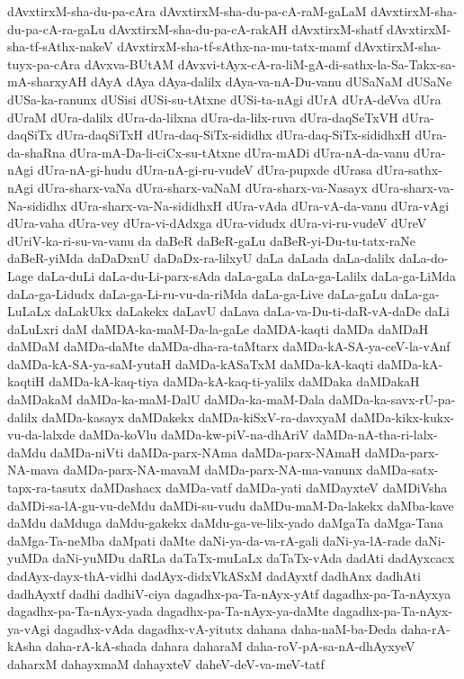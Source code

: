 {dAvxtirxM-sha-du-pa-cAra
dAvxtirxM-sha-du-pa-cA-raM-gaLaM
dAvxtirxM-sha-du-pa-cA-ra-gaLu
dAvxtirxM-sha-du-pa-cA-rakAH
dAvxtirxM-shatf
dAvxtirxM-sha-tf-sAthx-nakeV
dAvxtirxM-sha-tf-sAthx-na-mu-tatx-mamf
dAvxtirxM-sha-tuyx-pa-cAra
dAvxva-BUtAM
dAvxvi-tAyx-cA-ra-liM-gA-di-sathx-la-Sa-Takx-sa-mA-sharxyAH
dAyA
dAya
dAya-dalilx
dAya-va-nA-Du-vanu
dUSaNaM
dUSaNe
dUSa-ka-ranunx
dUSisi
dUSi-su-tAtxne
dUSi-ta-nAgi
dUrA
dUrA-deVva
dUra
dUraM
dUra-dalilx
dUra-da-lilxna
dUra-da-lilx-ruva
dUra-daqSeTxVH
dUra-daqSiTx
dUra-daqSiTxH
dUra-daq-SiTx-sididhx
dUra-daq-SiTx-sididhxH
dUra-da-shaRna
dUra-mA-Da-li-ciCx-su-tAtxne
dUra-mADi
dUra-nA-da-vanu
dUra-nAgi
dUra-nA-gi-hudu
dUra-nA-gi-ru-vudeV
dUra-pupxde
dUrasa
dUra-sathx-nAgi
dUra-sharx-vaNa
dUra-sharx-vaNaM
dUra-sharx-va-Nasayx
dUra-sharx-va-Na-sididhx
dUra-sharx-va-Na-sididhxH
dUra-vAda
dUra-vA-da-vanu
dUra-vAgi
dUra-vaha
dUra-vey
dUra-vi-dAdxga
dUra-vidudx
dUra-vi-ru-vudeV
dUreV
dUriV-ka-ri-su-va-vanu
da
daBeR
daBeR-gaLu
daBeR-yi-Du-tu-tatx-raNe
daBeR-yiMda
daDaDxnU
daDaDx-ra-lilxyU
daLa
daLada
daLa-dalilx
daLa-do-Lage
daLa-duLi
daLa-du-Li-parx-sAda
daLa-gaLa
daLa-ga-Lalilx
daLa-ga-LiMda
daLa-ga-Lidudx
daLa-ga-Li-ru-vu-da-riMda
daLa-ga-Live
daLa-gaLu
daLa-ga-LuLaLx
daLakUkx
daLakekx
daLavU
daLava
daLa-va-Du-ti-daR-vA-daDe
daLi
daLuLxri
daM
daMDA-ka-maM-Da-la-gaLe
daMDA-kaqti
daMDa
daMDaH
daMDaM
daMDa-daMte
daMDa-dha-ra-taMtarx
daMDa-kA-SA-ya-ceV-la-vAnf
daMDa-kA-SA-ya-saM-yutaH
daMDa-kASaTxM
daMDa-kA-kaqti
daMDa-kA-kaqtiH
daMDa-kA-kaq-tiya
daMDa-kA-kaq-ti-yalilx
daMDaka
daMDakaH
daMDakaM
daMDa-ka-maM-DalU
daMDa-ka-maM-Dala
daMDa-ka-savx-rU-pa-dalilx
daMDa-kasayx
daMDakekx
daMDa-kiSxV-ra-davxyaM
daMDa-kikx-kukx-vu-da-lalxde
daMDa-koVlu
daMDa-kw-piV-na-dhAriV
daMDa-nA-tha-ri-lalx-daMdu
daMDa-niVti
daMDa-parx-NAma
daMDa-parx-NAmaH
daMDa-parx-NA-mava
daMDa-parx-NA-mavaM
daMDa-parx-NA-ma-vanunx
daMDa-satx-tapx-ra-tasutx
daMDashacx
daMDa-vatf
daMDa-yati
daMDayxteV
daMDiVsha
daMDi-sa-lA-gu-vu-deMdu
daMDi-su-vudu
daMDu-maM-Da-lakekx
daMba-kave
daMdu
daMduga
daMdu-gakekx
daMdu-ga-ve-lilx-yado
daMgaTa
daMga-Tana
daMga-Ta-neMba
daMpati
daMte
daNi-ya-da-va-rA-gali
daNi-ya-lA-rade
daNi-yuMDa
daNi-yuMDu
daRLa
daTaTx-muLaLx
daTaTx-vAda
dadAti
dadAyxcacx
dadAyx-dayx-thA-vidhi
dadAyx-didxVkASxM
dadAyxtf
dadhAnx
dadhAti
dadhAyxtf
dadhi
dadhiV-ciya
dagadhx-pa-Ta-nAyx-yAtf
dagadhx-pa-Ta-nAyxya
dagadhx-pa-Ta-nAyx-yada
dagadhx-pa-Ta-nAyx-ya-daMte
dagadhx-pa-Ta-nAyx-ya-vAgi
dagadhx-vAda
dagadhx-vA-yitutx
dahana
daha-naM-ba-Deda
daha-rA-kAsha
daha-rA-kA-shada
dahara
daharaM
daha-roV-pA-sa-nA-dhAyxyeV
daharxM
dahayxmaM
dahayxteV
daheV-deV-va-meV-tatf
}
